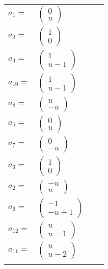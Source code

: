 \documentclass[1p]{elsarticle_modified}
\theoremstyle{definition}
\begin{document}
\begin{tabular}{m{7pt} m{180pt} m{7pt} m{180pt} }
\flushright $a_{1}=$&$\begin{pmatrix}0\\u\end{pmatrix}$ \\
\flushright $a_{9}=$&$\begin{pmatrix}1\\0\end{pmatrix}$ \\
\flushright $a_{4}=$&$\begin{pmatrix}1\\u-1\end{pmatrix}$ \\
\flushright $a_{10}=$&$\begin{pmatrix}1\\u-1\end{pmatrix}$ \\
\flushright $a_{8}=$&$\begin{pmatrix}u\\- u\end{pmatrix}$ \\
\flushright $a_{5}=$&$\begin{pmatrix}0\\u\end{pmatrix}$ \\
\flushright $a_{7}=$&$\begin{pmatrix}0\\- u\end{pmatrix}$ \\
\flushright $a_{3}=$&$\begin{pmatrix}1\\0\end{pmatrix}$ \\
\flushright $a_{2}=$&$\begin{pmatrix}- u\\u\end{pmatrix}$ \\
\flushright $a_{6}=$&$\begin{pmatrix}-1\\- u+1\end{pmatrix}$ \\
\flushright $a_{12}=$&$\begin{pmatrix}u\\u-1\end{pmatrix}$ \\
\flushright $a_{11}=$&$\begin{pmatrix}u\\u-2\end{pmatrix}$\\&\end{tabular}
\end{document}
